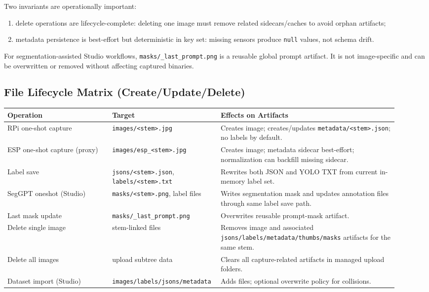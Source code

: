 Two invariants are operationally important:
\begin{enumerate}
  \item delete operations are lifecycle-complete: deleting one image must remove related sidecars/caches to avoid orphan artifacts;
  \item metadata persistence is best-effort but deterministic in key set: missing sensors produce \texttt{null} values, not schema drift.
\end{enumerate}

For segmentation-assisted Studio workflows, \texttt{masks/\_last\_prompt.png} is a reusable global prompt artifact. It is not image-specific and can be overwritten or removed without affecting captured binaries.

\subsection{File Lifecycle Matrix (Create/Update/Delete)}
\begin{longtable}{p{0.26\linewidth} p{0.22\linewidth} p{0.44\linewidth}}
\toprule
Operation & Target & Effects on Artifacts \\
\midrule
RPi one-shot capture & \texttt{images/<stem>.jpg} & Creates image; creates/updates \texttt{metadata/<stem>.json}; no labels by default. \\
ESP one-shot capture (proxy) & \texttt{images/esp\_<stem>.jpg} & Creates image; metadata sidecar best-effort; normalization can backfill missing sidecar. \\
Label save & \texttt{jsons/<stem>.json}, \texttt{labels/<stem>.txt} & Rewrites both JSON and YOLO TXT from current in-memory label set. \\
SegGPT oneshot (Studio) & \texttt{masks/<stem>.png}, label files & Writes segmentation mask and updates annotation files through same label save path. \\
Last mask update & \texttt{masks/\_last\_prompt.png} & Overwrites reusable prompt-mask artifact. \\
Delete single image & stem-linked files & Removes image and associated \texttt{jsons/labels/metadata/thumbs/masks} artifacts for the same stem. \\
Delete all images & upload subtree data & Clears all capture-related artifacts in managed upload folders. \\
Dataset import (Studio) & \texttt{images/labels/jsons/metadata} & Adds files; optional overwrite policy for collisions. \\
\bottomrule
\end{longtable}

